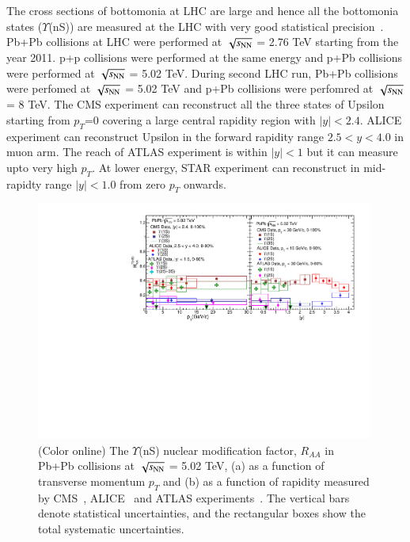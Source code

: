  The cross sections of bottomonia at LHC are large and hence all the 
bottomonia states ($\Upsilon$(nS)) are measured at the LHC with very good statistical
precision~\cite{Chatrchyan:2011pe,Chatrchyan:2012lxa,Abelev:2014nua,Khachatryan:2016xxp}.
 Pb+Pb collisions at LHC were performed at $\sqrt{s_{\rm NN}}$ = 2.76 TeV starting from 
the year 2011. p+p collisions were performed at the same energy and p+Pb collisions were
performed at $\sqrt{s_{\rm NN}}$ = 5.02 TeV. 
During second LHC run, Pb+Pb collisions were perfomed at $\sqrt{s_{\rm NN}}$ = 5.02 TeV 
and p+Pb collisions were perfomred at $\sqrt{s_{\rm NN}}$ = 8 TeV. 
The CMS experiment can reconstruct all the three states of Upsilon starting from
$p_T$=0 covering a large central rapidity region with $|y| < 2.4$.
ALICE experiment can reconstruct Upsilon in the forward rapidity range
$2.5 < y < 4.0$ in muon arm.
The reach of ATLAS experiment is within $|y| < 1$ but it can measure upto very high $p_T$.
At lower energy, STAR experiment can reconstruct in mid-rapidty range
$|y| < 1.0$ from zero $p_T$ onwards. 

\begin{figure}
  \includegraphics[width=0.99\textwidth]{Figures/Fig5_LHC_YnSRAAPtRap.pdf}
  \caption{(Color online) The $\Upsilon$(nS) nuclear modification factor, $R_{AA}$
in Pb+Pb collisions at $\sqrt{s_{\rm NN}}$ = 5.02 TeV, (a) as a function of transverse momentum $p_{T}$
    and (b) as a function of rapidity measured by CMS~\cite{CMS:2018zza}, ALICE~\cite{ALICE:2020wwx}
    and ATLAS experiments~\cite{ALICE:2020wwx}.
    The vertical bars denote statistical uncertainties, and the rectangular boxes
    show the total systematic uncertainties.
  }
  \label{fig:LHCYnSRAAPtRap}
\end{figure}


